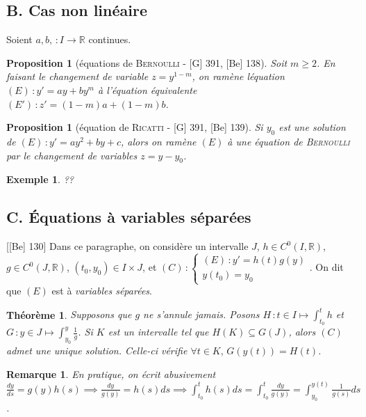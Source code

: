 \documentclass[10pt, a4paper, parskip=full, twoside, twocolumn]{report}
\newtheorem{theorem}[definition]{Théorème}
\newtheorem{proposition}[definition]{Proposition}
\newtheorem{example}[definition]{Exemple}
\newtheorem{remark}[definition]{Remarque}
\newcommand{\IR}{\mathbb{R}}
\begin{document}
\subsection*{B. Cas non linéaire}
\textcolor{paragraphtext}{Soient $a,b,\,\colon I\to \IR$ continues.}

\begin{proposition}[équations de \textsc{Bernoulli} - \textnormal{[G] 391, [Be] 138}]
	Soit $m\geq 2$. En faisant le changement de variable $z=y^{1-m}$, on ramène léquation $(E)\,\colon y'=ay + by^m$ à l'équation équivalente $(E')\,\colon z' = (1-m)a + (1-m)b$.
\end{proposition}

\begin{proposition}[équation de \textsc{Ricatti} - \textnormal{[G] 391, [Be] 139}]
	Si $y_0$ est une solution de $(E)\,\colon y'=ay^2 + by + c$, 
	alors on ramène $(E)$ à une équation de \textsc{Bernoulli} par le changement de variables $z=y-y_0$.
\end{proposition}

\begin{example}
	??
\end{example}

\subsection*{C. Équations à variables séparées}
[\textnormal{[Be] 130}]
\textcolor{paragraphtext}{Dans ce paragraphe, on considère un intervalle $J$, $h\in C^0(I, \IR)$, $g\in C^0(J,\IR)$, $(t_0, y_0)\in I\times J$, et $(C)\,\colon \begin{cases}
	(E)\,\colon y'=h(t)g(y) \\ y(t_0) = y_0
\end{cases}$. On dit que $(E)$ est à \emph{variables séparées}.}

\begin{theorem}
	Supposons que $g$ ne s'annule jamais. Posons $H\,\colon t\in I\mapsto \int_{t_0}^{t} h$ et $G\,\colon y\in J\mapsto \int_{y_0}^{y}\frac{1}{g}$.
	Si $K$ est un intervalle tel que $H(K)\subseteq G(J)$, alors $(C)$ admet une unique solution. Celle-ci vérifie $\forall t\in K,\, G(y(t)) = H(t)$.
\end{theorem}

\begin{remark}
	En pratique, on écrit abusivement $\frac{dy}{ds} = g(y)h(s)\implies \frac{dy}{g(y)} = h(s)ds \implies \int_{t_0}^{t}h(s)ds = \int_{t_0}^{t}\frac{dy}{g(y)} = \int_{y_0}^{y(t)}\frac{1}{g(s)}ds$.
\end{remark}
\end{document}
